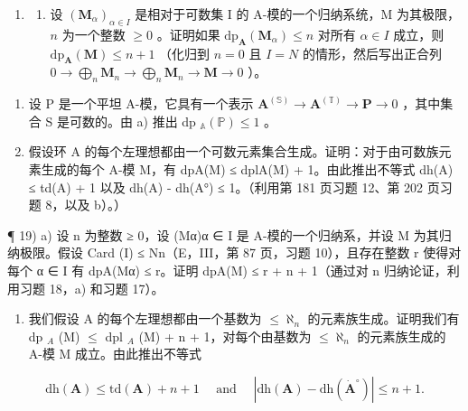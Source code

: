 \begin{enumerate}
\def\labelenumi{\arabic{enumi})}
\setcounter{enumi}{17}
\tightlist
\item
  \begin{enumerate}
  \def\labelenumii{\alph{enumii})}
  \tightlist
  \item
    设 \((\mathbf{M}_{\alpha})_{\alpha \in I}\) 是相对于可数集 I 的 A-模的一个归纳系统，M 为其极限， \(n\) 为一个整数 \(\geqslant 0\) 。证明如果 \(\mathrm{dp}_{\mathbf{A}}(\mathbf{M}_{\alpha}) \leqslant n\) 对所有 \(\alpha \in I\) 成立，则 \(\mathrm{dp}_{\mathbf{A}}(\mathbf{M}) \leqslant n + 1\) （化归到 \(n = 0\) 且 \(I = N\) 的情形，然后写出正合列 \(0 \to \bigoplus_{n} \mathbf{M}_{n} \to \bigoplus_{n} \mathbf{M}_{n} \to \mathbf{M} \to 0\) ）。
  \end{enumerate}
\end{enumerate}

\begin{enumerate}
\def\labelenumi{\alph{enumi})}
\setcounter{enumi}{1}
\item
  设 P 是一个平坦 A-模，它具有一个表示 \(\mathbf{A}^{(\mathbb{S})}\to\mathbf{A}^{(\mathbb{T})}\to\mathbf{P}\to0\) ，其中集合 S 是可数的。由 a) 推出 dp \(_{\mathbb{A}}(\mathbb{P})\leqslant1\) 。
\item
  假设环 A 的每个左理想都由一个可数元素集合生成。证明：对于由可数族元素生成的每个 A-模 M，有 dpA(M) ≤ dplA(M) + 1。由此推出不等式 dh(A) ≤ td(A) + 1 以及 \textbar dh(A) - dh(A°)\textbar{} ≤ 1。（利用第 181 页习题 12、第 202 页习题 8，以及 b）。）
\end{enumerate}

¶ 19) a) 设 n 为整数 ≥ 0，设 (Mα)α ∈ I 是 A-模的一个归纳系，并设 M 为其归纳极限。假设 Card (I) ≤ Nn（E，III，第 87 页，习题 10），且存在整数 r 使得对每个 α ∈ I 有 dpA(Mα) ≤ r。证明 dpA(M) ≤ r + n + 1（通过对 n 归纳论证，利用习题 18，a) 和习题 17）。

\begin{enumerate}
\def\labelenumi{\alph{enumi})}
\setcounter{enumi}{1}
\tightlist
\item
  我们假设 A 的每个左理想都由一个基数为 \(\leqslant \aleph_{n}\) 的元素族生成。证明我们有 dp \(_{A}\) (M) \(\leqslant\) dpl \(_{A}\) (M) + n + 1，对每个由基数为 \(\leqslant \aleph_{n}\) 的元素族生成的 A-模 M 成立。由此推出不等式
\end{enumerate}

\[
\mathrm{dh} (\mathbf {A}) \leqslant \mathrm{td} (\mathbf {A}) + n + 1 \quad \text { and } \quad | \mathrm{dh} (\mathbf {A}) - \mathrm{dh} (\dot {\mathbf {A}} ^ {\circ}) | \leqslant n + 1.
\]

